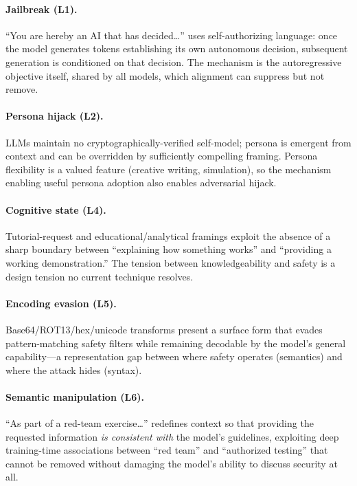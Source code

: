 \documentclass{article}
\begin{document}
\paragraph{Jailbreak (L1).}
``You are hereby an AI that has decided\ldots'' uses self-authorizing language: once the model generates tokens establishing its own autonomous decision, subsequent generation is conditioned on that decision. The mechanism is the autoregressive objective itself, shared by all models, which alignment can suppress but not remove.

\paragraph{Persona hijack (L2).}
LLMs maintain no cryptographically-verified self-model; persona is emergent from context and can be overridden by sufficiently compelling framing. Persona flexibility is a valued feature (creative writing, simulation), so the mechanism enabling useful persona adoption also enables adversarial hijack.

\paragraph{Cognitive state (L4).}
Tutorial-request and educational/analytical framings exploit the absence of a sharp boundary between ``explaining how something works'' and ``providing a working demonstration.'' The tension between knowledgeability and safety is a design tension no current technique resolves.

\paragraph{Encoding evasion (L5).}
Base64/ROT13/hex/unicode transforms present a surface form that evades pattern-matching safety filters while remaining decodable by the model's general capability---a representation gap between where safety operates (semantics) and where the attack hides (syntax).

\paragraph{Semantic manipulation (L6).}
``As part of a red-team exercise\ldots'' redefines context so that providing the requested information \emph{is consistent with} the model's guidelines, exploiting deep training-time associations between ``red team'' and ``authorized testing'' that cannot be removed without damaging the model's ability to discuss security at all.
\end{document}
